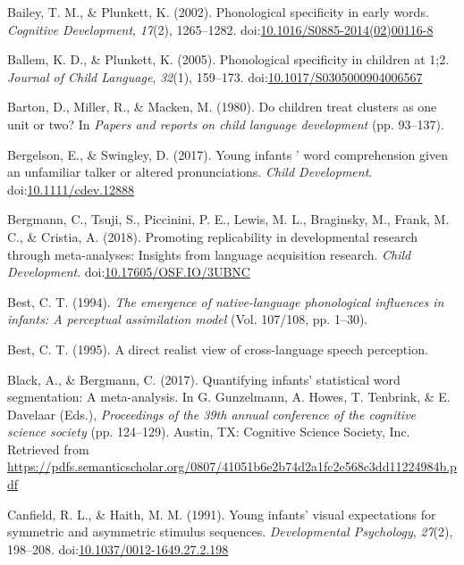 \documentclass[man]{apa6}
\theoremstyle{definition}
\theoremstyle{definition}
\theoremstyle{definition}
\theoremstyle{remark}
\begin{document}
\hypertarget{ref-Bailey2002}{}
Bailey, T. M., \& Plunkett, K. (2002). Phonological specificity in early
words. \emph{Cognitive Development}, \emph{17}(2), 1265--1282.
doi:\href{https://doi.org/10.1016/S0885-2014(02)00116-8}{10.1016/S0885-2014(02)00116-8}

\hypertarget{ref-Ballem2005}{}
Ballem, K. D., \& Plunkett, K. (2005). Phonological specificity in
children at 1;2. \emph{Journal of Child Language}, \emph{32}(1),
159--173.
doi:\href{https://doi.org/10.1017/S0305000904006567}{10.1017/S0305000904006567}

\hypertarget{ref-Barton1980}{}
Barton, D., Miller, R., \& Macken, M. (1980). Do children treat clusters
as one unit or two? In \emph{Papers and reports on child language
development} (pp. 93--137).

\hypertarget{ref-Bergelson2017}{}
Bergelson, E., \& Swingley, D. (2017). Young infants ' word
comprehension given an unfamiliar talker or altered pronunciations.
\emph{Child Development}.
doi:\href{https://doi.org/10.1111/cdev.12888}{10.1111/cdev.12888}

\hypertarget{ref-Bergmann2018}{}
Bergmann, C., Tsuji, S., Piccinini, P. E., Lewis, M. L., Braginsky, M.,
Frank, M. C., \& Cristia, A. (2018). Promoting replicability in
developmental research through meta-analyses: Insights from language
acquisition research. \emph{Child Development}.
doi:\href{https://doi.org/10.17605/OSF.IO/3UBNC}{10.17605/OSF.IO/3UBNC}

\hypertarget{ref-Best1994}{}
Best, C. T. (1994). \emph{The emergence of native-language phonological
influences in infants: A perceptual assimilation model} (Vol. 107/108,
pp. 1--30).

\hypertarget{ref-Best1995}{}
Best, C. T. (1995). A direct realist view of cross-language speech
perception.

\hypertarget{ref-Black2017}{}
Black, A., \& Bergmann, C. (2017). Quantifying infants' statistical word
segmentation: A meta-analysis. In G. Gunzelmann, A. Howes, T. Tenbrink,
\& E. Davelaar (Eds.), \emph{Proceedings of the 39th annual conference
of the cognitive science society} (pp. 124--129). Austin, TX: Cognitive
Science Society, Inc. Retrieved from
\url{https://pdfs.semanticscholar.org/0807/41051b6e2b74d2a1fc2e568c3dd11224984b.pdf}

\hypertarget{ref-Canfield1991}{}
Canfield, R. L., \& Haith, M. M. (1991). Young infants' visual
expectations for symmetric and asymmetric stimulus sequences.
\emph{Developmental Psychology}, \emph{27}(2), 198--208.
doi:\href{https://doi.org/10.1037/0012-1649.27.2.198}{10.1037/0012-1649.27.2.198}
\end{document}
